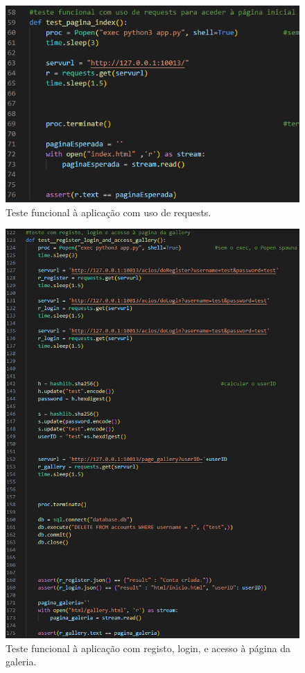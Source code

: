 \documentclass{report}
\begin{document}
    \begin{figure}[!hbtp]
        \centering 
        \includegraphics[scale=1]{Images_code/15 - testes 5.png}
        \caption{\label{Testes}Teste funcional à aplicação com uso de requests.}
    \end{figure}

    \begin{figure}[!hbtp]
        \centering 
        \includegraphics[scale=0.7]{Images_code/15 - testes 6.png}
        \caption{\label{Testes}Teste funcional à aplicação com registo, login, e acesso à página da galeria.}
    \end{figure}
\end{document}
